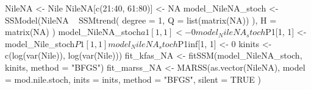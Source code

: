 \begin{Schunk}
\begin{Sinput}
 NileNA <- Nile
 NileNA[c(21:40, 61:80)] <- NA
 model_NileNA_stoch <-
   SSModel(NileNA ~ SSMtrend(
     degree = 1,
     Q = list(matrix(NA))
   ),
   H = matrix(NA)
   )
 model_NileNA_stoch$a1[1, 1] <- 0
 model_NileNA_stoch$P1[1, 1] <- model_Nile_stoch$P1[1, 1]
 model_NileNA_stoch$P1inf[1, 1] <- 0
 kinits <- c(log(var(Nile)), log(var(Nile)))
 fit_kfas_NA <- fitSSM(model_NileNA_stoch, kinits, method = "BFGS")
 fit_marss_NA <- MARSS(as.vector(NileNA),
   model = mod.nile.stoch,
   inits = inits, method = "BFGS", silent = TRUE
 )
\end{Sinput}
\end{Schunk}
